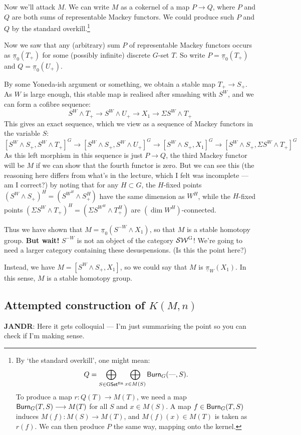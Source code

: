 \documentclass[11pt]{article}
\newcommand{\rednote}[1]{{\color{red}#1}\scalebox{.1}{rednote}}
\newcommand{\bluenote}[1]{{\color{blue}#1}\scalebox{.1}{rednote}}
\begin{document}
Now we'll attack $M$. We can write $M$ as a cokernel of a map $P\to Q$, where $P$ and $Q$ are both sums of representable Mackey functors. We could produce such $P$ and $Q$ by the standard overkill.\footnote{
By `the standard overkill', one might mean:
\[Q=\bigoplus_{S\in \operatorname{{G\mathsf{Set}^\textup{fin}}}}\bigoplus_{x\in M(S)}\operatorname{{\mathsf{Burn}}}_G(\textup{---},S).\]
To produce a map $r:Q(T)\to M(T)$, we need a map $\operatorname{{\mathsf{Burn}}}_G(T,S)\longrightarrow M(T)$ for all $S$ and $x\in M(S)$. A map $f\in \operatorname{{\mathsf{Burn}}}_G(T,S)$ induces $M(f):M(S)\to M(T)$, and $M(f)(x)\in M(T)$ is taken as $r(f)$.
We can then produce $P$ the same way, mapping onto the kernel.}

Now we saw that any (arbitrary) sum $P$ of representable Mackey functors occurs as $\underline\pi_0(T_+)$ for some (possibly infinite) discrete $G$-set $T$. So write $P=\underline\pi_0(T_+)$ and $Q=\underline\pi_0(U_+)$.

\rednote{By some Yoneda-ish argument or something}, we obtain a stable map $T_+\to S_+$. As $W$ is large enough, this stable map is realised after smashing with $S^W$, and we can form a cofibre sequence:
\[S^W\wedge T_+\to S^W\wedge U_+\to X_1\to \Sigma S^W\wedge T_+\]
This gives an exact sequence, which we view as a sequence of Mackey functors in the variable $S$:
\[[S^W\wedge S_+,S^W\wedge T_+]^G\to[S^W\wedge S_+,S^W\wedge U_+]^G\to [S^W\wedge S_+,X_1]^G\to [S^W\wedge S_+,\Sigma S^W\wedge T_+]^G\]
As this left morphism in this sequence is just $P\to Q$, the third Mackey functor will be $M$ if we can show that the fourth functor is zero. But we can see this \bluenote{(the reasoning here differs from what's in the lecture, which I felt was incomplete --- am I correct?)} by noting that for any $H\subset G$, the $H$-fixed points $(S^W\wedge S_+)^H=(S^{W^H}\wedge S^H_+)$ have the same dimension as $W^H$, while the $H$-fixed points $(\Sigma S^W\wedge T_+)^H=(\Sigma S^{W^H}\wedge T^H_+)$ are $(\dim W^H)$-connected.

Thus we have shown that $M=\underline\pi_0(S^{-W}\wedge X_1)$, so that $M$ is a stable homotopy group. \textbf{But wait!} $S^{-W}$ is not an object of the category $\operatorname{{\mathcal{SW}^G}}$! We're going to need a larger category containing these desuspensions. \rednote{(Is this the point here?)}

Instead, we have $M=[S^W\wedge S_+,X_1]$, so we could say that $M$ is $\underline\pi_W(X_1)$. In this sense, $M$ is a stable homotopy group.
\subsection*{Attempted construction of $K(M,n)$}
\rednote{\textbf{JANDR}: Here it gets colloquial --- I'm just summarising the point so you can check if I'm making sense.}
\end{document}
